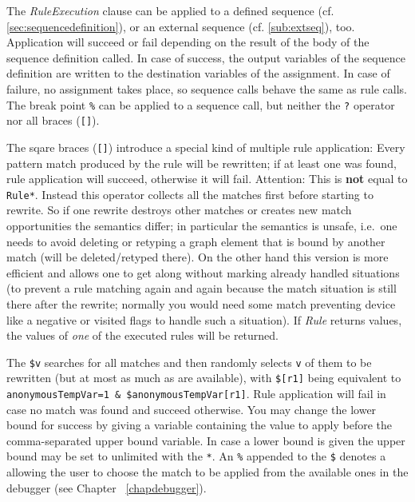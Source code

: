 The \emph{RuleExecution} clause can be applied to a defined sequence (cf. \ref{sec:sequencedefinition}), or an external sequence (cf. \ref{sub:extseq}), too.
Application will succeed or fail depending on the result of the body of the sequence definition called.
In case of success, the output variables of the sequence definition are written to the destination variables of the assignment. In case of failure, no assignment takes place, so sequence calls behave the same as rule calls.
The break point \texttt{\%} can be applied to a sequence call, but neither the \texttt{?} operator nor all braces (\texttt{[]}).

The sqare braces (\texttt{[]}) introduce a special kind of multiple rule application:
Every pattern match produced by the rule will be rewritten;
if at least one was found, rule application will succeed, otherwise it will fail. 
Attention: This  is \textbf{not} equal to \texttt{Rule*}.
Instead this operator collects all the matches first before starting to rewrite.
So if one rewrite destroys other matches or creates new match opportunities the semantics differ;
in particular the semantics is unsafe, i.e.\ one needs to avoid deleting or retyping a graph element that is bound by another match (will be deleted/retyped there). On the other hand this version is more efficient and allows one to get along without marking already handled situations (to prevent a rule matching again and again because the match situation is still there after the rewrite; normally you would need some match preventing device like a negative or visited flags to handle such a situation).
If \emph{Rule} returns values, the values of \emph{one} of the executed rules will be returned.

The  \texttt{\$v} searches for all matches and then randomly selects \texttt{v} of them to be rewritten (but at most as much as are available), with \texttt{\$[r1]} being equivalent to \texttt{anonymousTempVar=1 \& \$anonymousTempVar[r1]}.
Rule application will fail in case no match was found and succeed otherwise. 
You may change the lower bound for success by giving a variable containing the value to apply before the comma-separated upper bound variable.
In case a lower bound is given the upper bound may be set to unlimited with the \texttt{*}.
An \texttt{\%} appended to the \texttt{\$} denotes a  
allowing the user to choose the match to be applied from the available ones in the debugger (see Chapter ~\ref{chapdebugger}).

